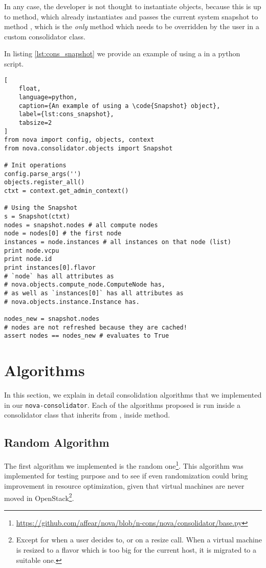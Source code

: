 In any case, the developer is not thought to instantiate  objects, because this is up to  method, which already instantiates and passes the current system snapshot to method , which is the \emph{only} method which needs to be overridden by the user in a custom consolidator class.

In listing \ref{lst:cons_snapshot} we provide an example of using a  in a python script.

\begin{lstlisting}[
	float,
	language=python,
	caption={An example of using a \code{Snapshot} object},
	label={lst:cons_snapshot},
	tabsize=2
]
from nova import config, objects, context
from nova.consolidator.objects import Snapshot

# Init operations
config.parse_args('')
objects.register_all()
ctxt = context.get_admin_context()

# Using the Snapshot
s = Snapshot(ctxt)
nodes = snapshot.nodes # all compute nodes
node = nodes[0] # the first node
instances = node.instances # all instances on that node (list)
print node.vcpu
print node.id
print instances[0].flavor
# `node` has all attributes as
# nova.objects.compute_node.ComputeNode has,
# as well as `instances[0]` has all attributes as
# nova.objects.instance.Instance has.

nodes_new = snapshot.nodes
# nodes are not refreshed because they are cached!
assert nodes == nodes_new # evaluates to True
\end{lstlisting}

\section{Algorithms}
\label{sec:cons_algs}
In this section, we explain in detail consolidation algorithms that we implemented in our \texttt{nova-consolidator}. Each of the algorithms proposed is run inside a consolidator class that inherits from , inside  method.

\subsection{Random Algorithm}
\label{sub:algs_rnd}
The first algorithm we implemented is the random one\footnote{\url{https://github.com/affear/nova/blob/n-cons/nova/consolidator/base.py}}. This algorithm was implemented for testing purpose and to see if even randomization could bring improvement in resource optimization, given that virtual machines are never moved in OpenStack\footnote{Except for when a user decides to, or on a resize call. When a virtual machine is resized to a flavor which is too big for the current host, it is migrated to a suitable one.}.

